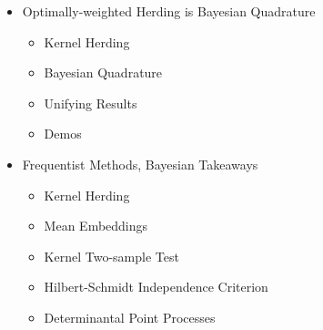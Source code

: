 \documentclass[usenames,dvipsnames]{beamer}
\begin{document}
\begin{frame}[plain, t]
	\bodyheaderskip
	\slidebody
	{
			\begin{itemize}
			\item Optimally-weighted Herding is Bayesian Quadrature
			\begin{itemize}
				\item Kernel Herding
				\item Bayesian Quadrature			
				\item Unifying Results
				\item Demos
			\end{itemize}			
			\item Frequentist Methods, Bayesian Takeaways
			\begin{itemize}
				\item Kernel Herding
				\item Mean Embeddings
				\item Kernel Two-sample Test
				\item Hilbert-Schmidt Independence Criterion
				\item Determinantal Point Processes
			\end{itemize}
		\end{itemize}
		
	}
\end{frame}
\end{document}
